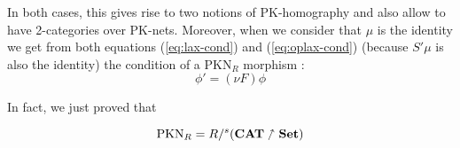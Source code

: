 In both cases, this gives rise to two notions of PK-homography and also allow to have 2-categories over PK-nets. Moreover, when we consider that $\mu$ is the identity we get from both equations (\ref{eq:lax-cond}) and (\ref{eq:oplax-cond}) (because $S'\mu$ is also the identity) the condition of a $\text{PKN}_R$ morphism :
$$\phi' = (\nu F)\phi$$

In fact, we just proved that
\begin{thm}
    $$\text{PKN}_R = R /^s (\bf CAT\nnearrow Set)$$
\end{thm}


